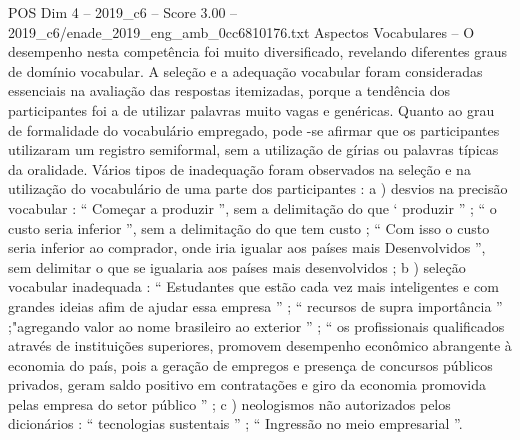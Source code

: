 \begin{textsample}{POS Dim 4 – 2019\_c6 – Score 3.00 – 2019\_c6/enade\_2019\_eng\_amb\_0cc6810176.txt}
Aspectos Vocabulares – O desempenho nesta competência foi muito diversificado, revelando diferentes graus de domínio vocabular.
A seleção e a adequação vocabular foram consideradas essenciais na avaliação das respostas itemizadas, porque a tendência dos participantes foi a de utilizar palavras muito vagas e genéricas.
Quanto ao grau de formalidade do vocabulário empregado, pode -se afirmar que os participantes utilizaram um registro semiformal, sem a utilização de gírias ou palavras típicas da oralidade.
Vários tipos de inadequação foram observados na seleção e na utilização do vocabulário de uma parte dos participantes : a ) desvios na precisão vocabular : “ Começar a produzir ”, sem a delimitação do que ‘ produzir ” ; “ o custo seria inferior ”, sem a delimitação do que tem custo ; “ Com isso o custo seria inferior ao comprador, onde iria igualar aos países mais Desenvolvidos ”, sem delimitar o que se igualaria aos países mais desenvolvidos ; b ) seleção vocabular inadequada : “ Estudantes que estão cada vez mais inteligentes e com grandes ideias afim de ajudar essa empresa ” ; “ recursos de supra importância ” ;"agregando valor ao nome brasileiro ao exterior ” ; “ os profissionais qualificados através de instituições superiores, promovem desempenho econômico abrangente à economia do país, pois a geração de empregos e presença de concursos públicos privados, geram saldo positivo em contratações e giro da economia promovida pelas empresa do setor público ” ; c ) neologismos não autorizados pelos dicionários : “ tecnologias sustentais ” ; “ Ingressão no meio empresarial ”.

\end{textsample}
